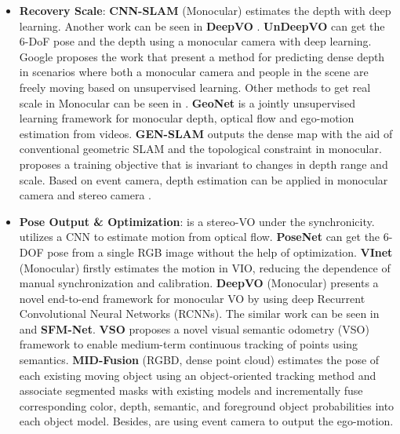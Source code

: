\documentclass[journal,transmag]{IEEEtran}
\begin{document}
\begin{itemize}
    \item \textbf{Recovery Scale}: \textbf{CNN-SLAM} (Monocular) \cite{tateno2017cnn} estimates the depth with deep learning. Another work can be seen in \textbf{DeepVO} \cite{mohanty2016deepvo}. \textbf{UnDeepVO} \cite{li2018undeepvo} can get the 6-DoF pose and the depth using a monocular camera with deep learning. Google proposes the work \cite{li2019learning} that present a method for predicting dense depth in scenarios where both a monocular camera and people in the scene are freely moving based on unsupervised learning. Other methods to get real scale in Monocular can be seen in \cite{8353862}\cite{Sucar2017Bayesian}. \textbf{GeoNet} \cite{yin2018geonet} is a jointly unsupervised learning framework for monocular depth, optical flow and ego-motion estimation from videos. \textbf{GEN-SLAM} \cite{chakravarty2019gen} outputs the dense map with the aid of conventional geometric SLAM and the topological constraint in monocular. \cite{Lasinger2019} proposes a training objective that is invariant to changes in depth range and scale. Based on event camera, depth estimation can be applied in monocular camera \cite{haessig2019spiking}\cite{gallego2018unifying} and stereo camera \cite{xie2017event}. 
    \item \textbf{Pose Output \& Optimization}:  \cite{konda2015learning} is a stereo-VO under the synchronicity. \cite{costante2015exploring} utilizes a CNN to estimate motion from optical flow. \textbf{PoseNet} \cite{kendall2015posenet} can get the 6-DOF pose from a single RGB image without the help of optimization. \textbf{VInet} (Monocular) \cite{clark2017vinet} firstly estimates the motion in VIO, reducing the dependence of manual synchronization and calibration. \textbf{DeepVO} (Monocular) \cite{wang2017deepvo} presents a novel end-to-end framework for monocular VO by using deep Recurrent Convolutional Neural Networks (RCNNs). The similar work can be seen in \cite{zhou2017unsupervised} and \textbf{SFM-Net}\cite{vijayanarasimhan2017sfm}. \textbf{VSO} \cite{Lianos2018VSO} proposes a novel visual semantic odometry (VSO) framework to enable medium-term continuous tracking of points using semantics. \textbf{MID-Fusion} (RGBD, dense point cloud) \cite{xu2018mid} estimates the pose of each existing moving object using an object-oriented tracking method and associate segmented masks with existing models and incrementally fuse corresponding color, depth, semantic, and foreground object probabilities into each object model. Besides, \cite{gallego2015event}\cite{reverter2016neuromorphic} are using event camera to output the ego-motion.

\end{itemize}
\end{document}
